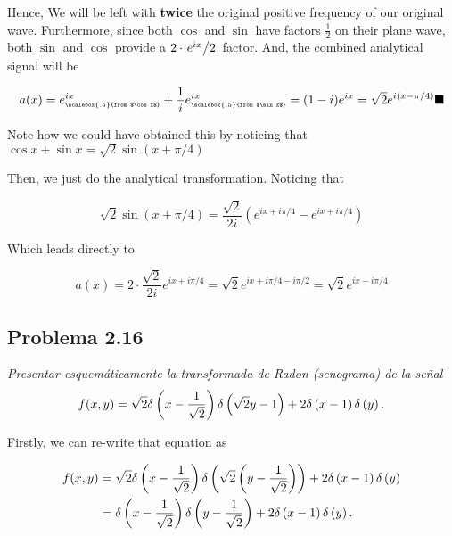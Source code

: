 \documentclass[../main/main.tex]{subfiles}
\begin{document}
Hence, We will be left with \textbf{twice} the original positive frequency of our original wave. Furthermore, since both $\cos$ and $\sin$ have factors $\frac12$ on their plane wave, both $\sin$ and $\cos$  provide a $2 \cdot \flatfrac{e^{ix}} 2$ factor. And, the combined analytical signal will be

\begin{equation}
	a(x) =
	e^{ix}_{\textrm{\tiny \scalebox{.5}{from $\cos x$}}}
	+ \frac{1}{i} e^{ix}_{\textrm{\tiny \scalebox{.5}{from $\sin x$}}}
	= (1-i)e^{ix}
	= \sqrt{2}e^{i(x - \pi / 4)}   \qed
\end{equation}

Note how we could have obtained this by noticing that $\cos x + \sin x = \sqrt{2} \sin (x + \pi/4)$

Then, we just do the analytical transformation. Noticing that

\begin{equation}
	\sqrt{2} \sin (x + \pi/4) = \frac{\sqrt{2}}{2i} \left(e^{ix + i\pi/4}-e^{ix + i\pi/4}\right)
\end{equation}

Which leads directly to

\begin{equation}
	a(x) = 2 \cdot \frac{\sqrt{2}}{2i} e^{ix + i\pi/4}
	= \sqrt{2} e^{ix + i\pi/4- i \pi / 2}
	= \sqrt{2} e^{ix - i\pi/4}
\end{equation}


\subsection*{Problema 2.16}

\emph{Presentar esquemáticamente la transformada de Radon (senograma) de la señal}
\begin{equation*}
	f(x,y) =
	\sqrt{2}
	\delta\left(x - \frac 1 {\sqrt{2}}\right)
	\delta\left(\sqrt{2}y - 1\right)
	+ 2
	\delta\left(x-1\right)
	\delta\left(y\right).
\end{equation*}

Firstly, we can re-write that equation as

\begin{align*}
	f(x,y) & =
	\sqrt{2}
	\delta\left(x - \frac 1 {\sqrt{2}}\right)
	\delta\left(\sqrt{2}\left(y - \frac 1 {\sqrt{2}}\right)\right)
	+ 2
	\delta\left(x-1\right)
	\delta\left(y\right) \\
	       & =
	\delta\left(x - \frac 1 {\sqrt{2}}\right)
	\delta\left(y - \frac 1 {\sqrt{2}}\right)
	+ 2
	\delta\left(x-1\right)
	\delta\left(y\right).
\end{align*}
\end{document}
